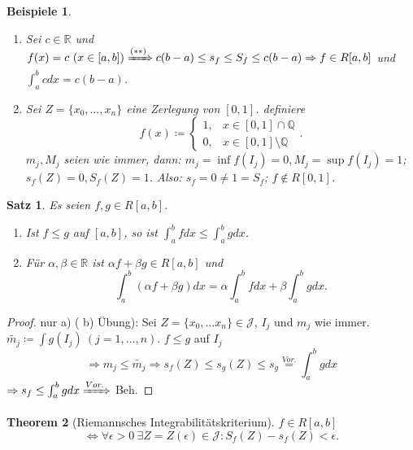 \documentclass[14pt,titlepage,ngerman,a4paper,headsepline,DIV15,halfparskip*]{scrartcl}
\newcommand{\Q}{\mathbb{Q}}
\newcommand{\R}{\mathbb{R}}
\theoremstyle{named}
\newtheorem{namedtheorem}{Theorem} \counterwithin{namedtheorem}{section}
\theoremstyle{dotless}
\newtheorem{satz}[namedtheorem]{Satz}
\newtheorem*{beispiele}{Beispiele}
\begin{document}
\begin{beispiele} ~\
	\begin{enumerate}
		\item Sei $c \in \R$ und $f(x) = c ~(x \in [a, b]) \xRightarrow[]{(**)} c (b - a) \leq s_{f} \leq S_{f} \leq c(b- a) \Rightarrow f \in R[a, b]$ und $\int_{a}^{b}c dx = c(b - a)$.
		\item Sei $Z = \{ x_{0}, \dotsc, x_{n} \}$ eine Zerlegung von $[0, 1]$. definiere
			$$ f(x) \coloneqq \begin{cases} 1, & x \in [0, 1] \cap \Q \\ 0, & x \in [0, 1] \setminus \Q \end{cases}. $$  
			$m_{j}, M_{j}$ seien wie immer, dann: $m_{j} = \inf f(I_{j}) = 0, M_{j} = \sup f(I_{j}) = 1$; $s_{f}(Z) = 0, S_{f}(Z) = 1$. Also: $s_{f} = 0 \neq 1 = S_{f}$; $f \notin R[0, 1]$.
	\end{enumerate}	
\end{beispiele}

\begin{satz} \label{10.2:satz}
	Es seien $f, g \in R[a, b]$.
	\begin{enumerate}
		\item Ist $f \leq g$ auf $[a, b]$, so ist $\int_{a}^{b} f dx \leq \int_{a}^{b} g dx$.
		\item Für $\alpha, \beta \in \R$ ist $\alpha f + \beta g \in R[a, b]$ und
			$$ \int_{a}^{b} (\alpha f + \beta g) dx = \alpha \int_{a}^{b} f dx + \beta \int_{a}^{b} g dx. $$
	\end{enumerate}
\end{satz}

\begin{proof}
	nur a) ( b) Übung): Sei $Z = \{ x_{0}, \dotsc x_{n} \} \in \mathcal{J}$, $I_{j}$ und $m_{j}$ wie immer. $\tilde{m_{j}} \coloneqq \int g(I_{j}) ~(j = 1, \dotsc, n)$. $f \leq g$ auf $I_{j}$
		$$ \Rightarrow m_{j} \leq \tilde{m_{j}} \Rightarrow s_{f}(Z) \leq s_{g}(Z) \leq s_{g} \overset{Vor.}{=} \int_{a}^{b} g dx $$ 
		$\Rightarrow s_{f} \leq \int_{a}^{b} g dx \xRightarrow[]{Vor.}$ Beh.
\end{proof}

\begin{namedtheorem}[Riemannsches Integrabilitätskriterium] \label{10.3:prop-RiemannschesIntegrabilitaetskriterium}
	$f \in R[a, b]$
	$$ \iff \forall \epsilon > 0 ~\exists Z = Z(\epsilon) \in \mathcal{J}: S_{f}(Z) - s_{f}(Z) < \epsilon. $$	
\end{namedtheorem}
\end{document}
